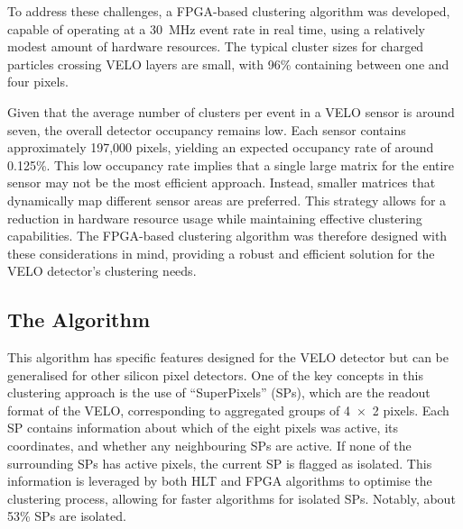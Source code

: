To address these challenges, a FPGA-based clustering algorithm was developed, capable of operating at a \SI{30}{\mega\hertz} event rate in real time, using a relatively modest amount of hardware resources. The typical cluster sizes for charged particles crossing VELO layers are small, with 96\% containing between one and four pixels. 

Given that the average number of clusters per event in a VELO sensor is around seven, the overall detector occupancy remains low. Each sensor contains approximately 197,000 pixels, yielding an expected occupancy rate of around 0.125\%\cite{Bediaga:2013tje}. This low occupancy rate implies that a single large matrix for the entire sensor may not be the most efficient approach. Instead, smaller matrices that dynamically map different sensor areas are preferred. This strategy allows for a reduction in hardware resource usage while maintaining effective clustering capabilities. The FPGA-based clustering algorithm was therefore designed with these considerations in mind, providing a robust and efficient solution for the VELO detector's clustering needs.

\subsection*{The Algorithm}
This algorithm has specific features designed for the VELO detector but can be generalised for other silicon pixel detectors. One of the key concepts in this clustering approach is the use of ``SuperPixels'' (SPs), which are the readout format of the VELO, corresponding to aggregated groups of 4~×~2 pixels. Each SP contains information about which of the eight pixels was active, its coordinates, and whether any neighbouring SPs are active. If none of the surrounding SPs has active pixels, the current SP is flagged as isolated. This information is leveraged by both HLT and FPGA algorithms to optimise the clustering process, allowing for faster algorithms for isolated SPs. Notably, about 53\% SPs are isolated.

